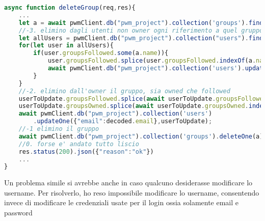 \begin{lstlisting}[language=JavaScript]
async function deleteGroup(req,res){
    ...
    let a = await pwmClient.db("pwm_project").collection('groups').findOne({"name": validator.escape(req.params.name)})
    //-3. elimino dagli utenti non owner ogni riferimento a quel gruppo
    let allUsers = pwmClient.db("pwm_project").collection("users").find({"email":{$not: decoded.email}})
    for(let user in allUsers){
        if(user.groupsFollowed.some(a.name)){
            user.groupsFollowed.splice(user.groupsFollowed.indexOf(a.name),1)
            await pwmClient.db("pwm_project").collection('users').updateOne({"email":user.email},user)
        }
    }
    //-2. elimino dall'owner il gruppo, sia owned che followed
    userToUpdate.groupsFollowed.splice(await userToUpdate.groupsFollowed.indexOf(a.name),1)
    userToUpdate.groupsOwned.splice(await userToUpdate.groupsOwned.indexOf(a.name),1)
    await pwmClient.db("pwm_project").collection('users')
        .updateOne({"email":decoded.email},userToUpdate);
    //-1 elimino il gruppo
    await pwmClient.db("pwm_project").collection('groups').deleteOne(a)
    //0. forse e' andato tutto liscio
    res.status(200).json({"reason":"ok"})
    ...
}
\end{lstlisting}
\alert{Un problema simile si avrebbe anche in caso qualcuno desiderasse modificare lo username. Per risolverlo, ho reso impossibile modificare lo username, consentendo invece di modificare le credenziali usate per il login ossia solamente email e password}
\newpage